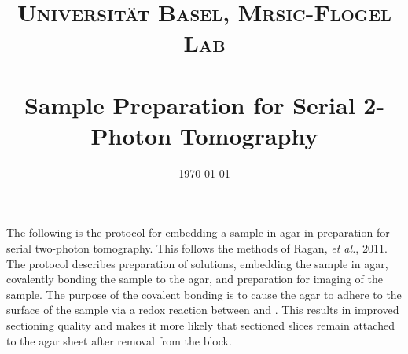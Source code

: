 \documentclass[paper=a4, fontsize=11pt]{scrartcl} %
\title{	
\normalfont \normalsize 
\textsc{Universit\"{a}t Basel, Mrsic-Flogel Lab} \\ [25pt] 
\horrule{0.5pt} \\[0.2cm] %
\huge Sample Preparation for Serial 2-Photon Tomography
\horrule{1.5pt}\\ %
}
\date{\normalsize\today} %
\numberwithin{equation}{section} %
\numberwithin{figure}{section} %
\numberwithin{table}{section} %
\begin{document}
\maketitle %

The following is the protocol for embedding a sample in agar in preparation for serial two-photon tomography. 
This follows the methods of Ragan, \textit{et al.}, 2011. 
The protocol describes preparation of solutions, embedding the sample in agar, covalently bonding the sample to the agar, and preparation for imaging of the sample.
The purpose of the covalent bonding is to cause the agar to adhere to the surface of the sample via a redox reaction between  and . 
This results in improved sectioning quality and makes it more likely that sectioned slices remain attached to the agar sheet after removal from the block. 
\end{document}
